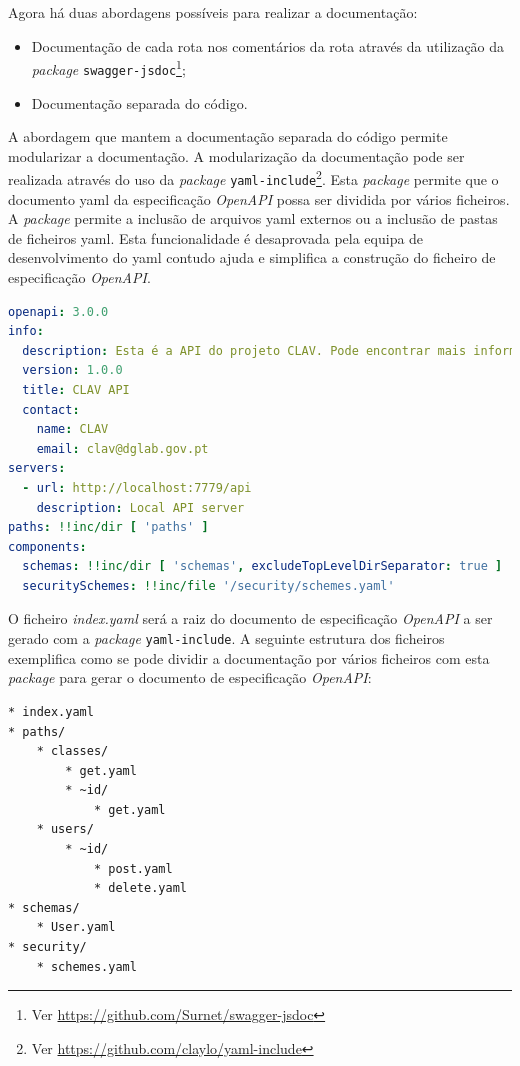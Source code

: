 Agora há duas abordagens possíveis para realizar a documentação:
\begin{itemize}
    \item Documentação de cada rota nos comentários da rota através da utilização da 
    \textit{package} \texttt{swagger-jsdoc}\footnote{Ver \url{https://github.com/Surnet/swagger-jsdoc}};
    \item Documentação separada do código.
\end{itemize}

A abordagem que mantem a documentação separada do código permite modularizar a documentação. A modularização da documentação 
pode ser realizada através do uso da \textit{package} \texttt{yaml-include}\footnote{Ver \url{https://github.com/claylo/yaml-include}}. Esta \textit{package} permite que o documento \acrshort{yaml} da especificação \textit{OpenAPI} possa ser dividida por vários ficheiros. A \textit{package} permite a inclusão de arquivos \acrshort{yaml} externos ou a inclusão de pastas de ficheiros \acrshort{yaml}. Esta funcionalidade é desaprovada pela equipa de desenvolvimento do \acrshort{yaml} contudo ajuda e simplifica a construção do ficheiro de especificação \textit{OpenAPI}.

\begin{lstlisting}[language=yaml, caption=Exemplo de uso do \texttt{yaml-include} no documento de especificação \textit{OpenAPI}(\textit{index.yaml}), label=exem:yamli]
openapi: 3.0.0
info:
  description: Esta é a API do projeto CLAV. Pode encontrar mais informação sobre o CLAV em [http://clav.dglab.gov.pt](http://clav.dglab.gov.pt).
  version: 1.0.0
  title: CLAV API
  contact:
    name: CLAV
    email: clav@dglab.gov.pt
servers:
  - url: http://localhost:7779/api
    description: Local API server
paths: !!inc/dir [ 'paths' ]
components:
  schemas: !!inc/dir [ 'schemas', excludeTopLevelDirSeparator: true ]
  securitySchemes: !!inc/file '/security/schemes.yaml'
\end{lstlisting}

O ficheiro \textit{index.yaml} será a raiz do documento de especificação \textit{OpenAPI} a ser gerado com 
a \textit{package} \texttt{yaml-include}. A seguinte estrutura dos ficheiros exemplifica como se pode dividir a 
documentação por vários ficheiros com esta \textit{package} para gerar o documento de especificação \textit{OpenAPI}:
\begin{lstlisting}[caption=Exemplo de estrutura dos ficheiros para gerar o documento de especificação \textit{OpenAPI}, label=exem:faf]
* index.yaml
* paths/
    * classes/
        * get.yaml
        * ~id/
            * get.yaml
    * users/
        * ~id/
            * post.yaml
            * delete.yaml
* schemas/
    * User.yaml
* security/
    * schemes.yaml
\end{lstlisting}

